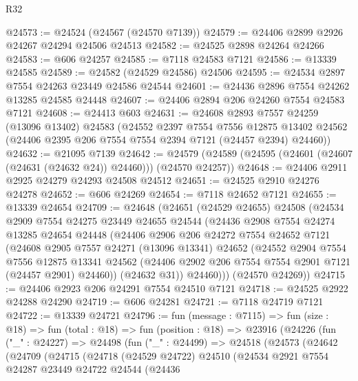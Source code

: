 \begin{lexlean}{R32}
\begin{coremodule}
@24573 := @24524 (@24567 (@24570 @7139))
@24579 := @24406 @2899 @2926 @24267 @24294 @24506 @24513
@24582 := @24525 @2898 @24264 @24266
@24583 := @606 @24257
@24585 := @7118 @24583 @7121
@24586 := @13339 @24585
@24589 := @24582 (@24529 @24586) @24506
@24595 := @24534 @2897 @7554 @24263 @23449 @24586 @24544
@24601 := @24436 @2896 @7554 @24262 @13285 @24585 @24448
@24607 := @24406 @2894 @206 @24260 @7554 @24583 @7121
@24608 := @24413 @603
@24631 := @24608
    @2893
    @7557
    @24259
    (@13096 @13402)
    @24583
    (@24552
      @2397
      @7554
      @7556
      @12875
      @13402
      @24562
      (@24406 @2395 @206 @7554 @7554 @2394 @7121 (@24457 @2394) @24460))
@24632 := @21095 @7139
@24642 := @24579 (@24589 (@24595 (@24601 (@24607 (@24631 (@24632 @24)) @24460))) (@24570 @24257))
@24648 := @24406 @2911 @2925 @24279 @24293 @24508 @24512
@24651 := @24525 @2910 @24276 @24278
@24652 := @606 @24269
@24654 := @7118 @24652 @7121
@24655 := @13339 @24654
@24709 := @24648
    (@24651
      (@24529 @24655)
      @24508
      (@24534
        @2909
        @7554
        @24275
        @23449
        @24655
        @24544
        (@24436
          @2908
          @7554
          @24274
          @13285
          @24654
          @24448
          (@24406
            @2906
            @206
            @24272
            @7554
            @24652
            @7121
            (@24608
              @2905
              @7557
              @24271
              (@13096 @13341)
              @24652
              (@24552
                @2904
                @7554
                @7556
                @12875
                @13341
                @24562
                (@24406 @2902 @206 @7554 @7554 @2901 @7121 (@24457 @2901) @24460))
              (@24632 @31))
            @24460)))
      (@24570 @24269))
@24715 := @24406 @2923 @206 @24291 @7554 @24510 @7121
@24718 := @24525 @2922 @24288 @24290
@24719 := @606 @24281
@24721 := @7118 @24719 @7121
@24722 := @13339 @24721
@24796 := fun (message : @7115) =>
  fun (size : @18) =>
  fun (total : @18) =>
  fun (position : @18) =>
  @23916
    (@24226
      (fun ("_" : @24227) =>
      @24498
        (fun ("_" : @24499) =>
        @24518
          (@24573
            (@24642
              (@24709
                (@24715
                  (@24718
                    (@24529 @24722)
                    @24510
                    (@24534
                      @2921
                      @7554
                      @24287
                      @23449
                      @24722
                      @24544
                      (@24436

\end{coremodule}
\end{lexlean}
